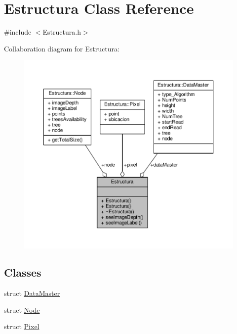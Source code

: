 \hypertarget{classEstructura}{}\section{Estructura Class Reference}
\label{classEstructura}


{\ttfamily \#include $<$Estructura.\+h$>$}



Collaboration diagram for Estructura\+:
\nopagebreak
\begin{figure}[H]
\begin{center}
\leavevmode
\includegraphics[width=350pt]{classEstructura__coll__graph}
\end{center}
\end{figure}
\subsection*{Classes}
\begin{DoxyCompactItemize}
\item 
struct \hyperlink{structEstructura_1_1DataMaster}{Data\+Master}
\item 
struct \hyperlink{structEstructura_1_1Node}{Node}
\item 
struct \hyperlink{structEstructura_1_1Pixel}{Pixel}
\end{DoxyCompactItemize}
